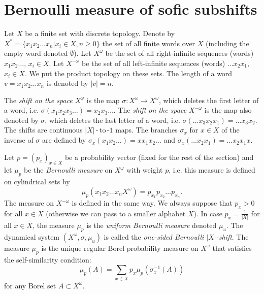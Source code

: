 \documentclass[12pt]{article}
\newcommand{\xmo}{X^{-\omega}}
\newcommand{\xo}{X^\omega}
\theoremstyle{definition}
\begin{document}
\section{Bernoulli measure of sofic subshifts}\label{section_Sofic}

Let $X$ be a finite set with discrete topology. Denote by $X^{*}=\{x_1x_2\ldots x_n | x_i\in X,
n\geq 0\}$ the set of all finite words over $X$ (including the empty word denoted $\emptyset$). Let
$X^{\omega}$ be the set of all right-infinite sequences (words) $x_1x_2\ldots$, $x_i\in X$. Let
$X^{-\omega}$ be the set of all left-infinite sequences (words) $\ldots x_2x_1$, $x_i\in X$. We put
the product topology on these sets. The length of a word $v=x_1x_2\ldots x_n$ is denoted by $|v| =
n$.

The \textit{shift on the space $\xo$} is the map $\sigma:\xo\rightarrow\xo$, which deletes the
first letter of a word, i.e. $\sigma(x_1x_2x_3\ldots) = x_2x_3\ldots$. The \textit{shift on the
space $\xmo$} is the map also denoted by $\sigma$, which deletes the last letter of a word, i.e.
$\sigma(\ldots x_3x_2x_1) = \ldots x_3x_2$. The shifts are continuous $|X|$\,-\,to\,-$1$ maps. The
branches $\sigma_x$ for $x\in X$ of the inverse of $\sigma$ are defined by
$\sigma_x(x_1x_2\ldots)=xx_1x_2\ldots$ and $\sigma_x(\ldots x_2x_1)=\ldots x_2x_1x$.

Let $p=(p_x)_{x\in X}$ be a probability vector (fixed for the rest of the section) and let $\mu_p$
be the \textit{Bernoulli measure} on $\xo$ with weight $p$, i.e. this measure is defined on
cylindrical sets by
\[
\mu_p(x_1x_2\ldots x_n\xo)=p_{x_1}p_{x_2}\ldots p_{x_n}.
\]
The measure on $\xmo$ is defined in the same way. We always suppose that $p_x>0$ for all $x\in X$
(otherwise we can pass to a smaller alphabet $X$). In case $p_x=\frac{1}{|X|}$ for all $x\in X$,
the measure $\mu_p$ is the \textit{uniform Bernoulli measure} denoted $\mu_u$. The dynamical system
$(\xo,\sigma,\mu_u)$ is called the \textit{one-sided Bernoulli $|X|$-shift}. The measure $\mu_p$ is
the unique regular Borel probability measure on $\xo$ that satisfies the self-similarity condition:
\[
\mu_p(A)=\sum_{x\in X} p_x\mu_p(\sigma_x^{-1}(A))
\]
for any Borel set $A\subset\xo$.

\end{document}
